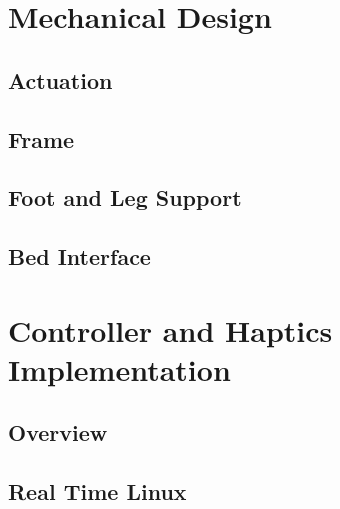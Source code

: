 \documentclass{article}
\begin{document}
\section{Mechanical Design}
	\subsection{Actuation}
%

	\subsection{Frame}
%
	\subsection{Foot and Leg Support}
%
	\subsection{Bed Interface}
%


\section{Controller and Haptics Implementation}

	\subsection{Overview}
		
	\subsection{Real Time Linux}
	
\end{document}
